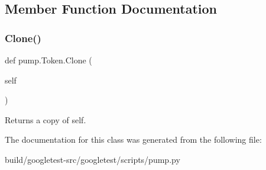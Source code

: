 \subsection{Member Function Documentation}
\mbox{\label{classpump_1_1Token_abc0f2d2a0bcad953f5fc85a4e52076eb}} 
\subsubsection{\texorpdfstring{Clone()}{Clone()}}
{\footnotesize\ttfamily def pump.\+Token.\+Clone (\begin{DoxyParamCaption}\item[{}]{self }\end{DoxyParamCaption})}

\begin{DoxyVerb}Returns a copy of self.\end{DoxyVerb}
 

The documentation for this class was generated from the following file\+:\begin{DoxyCompactItemize}
\item 
build/googletest-\/src/googletest/scripts/pump.\+py\end{DoxyCompactItemize}
